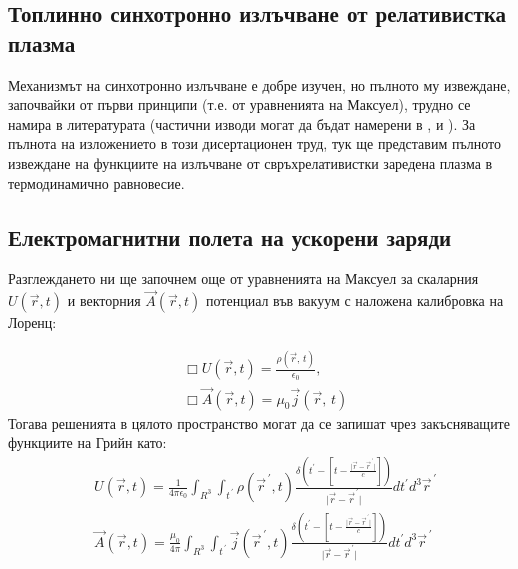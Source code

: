 \appendixpage
\begin{appendices}

	\section{Топлинно синхотронно излъчване от релативистка плазма}
	
	Механизмът на синхотронно излъчване е добре изучен, но пълното му извеждане, започвайки от първи принципи (т.е. от уравненията на Максуел), трудно се намира в литературата (частични изводи могат да бъдат намерени в \cite{Schwigner1949}, \cite{Westfold1959} и \cite{WESTFOLD_II}). За пълнота на изложението в този дисертационен труд, тук ще представим пълното извеждане на функциите на излъчване от свръхрелативистки заредена плазма в термодинамично равновесие.
	
	\subsection{Електромагнитни полета на ускорени заряди}
	
	Разглеждането ни ще започнем още от уравненията на Максуел за скаларния $U\left(\vec{r},t\right)$ и векторния $\vec{A}\left(\vec{r},t\right)$ потенциал във вакуум с наложена калибровка на Лоренц:
	
	\begin{equation}
		\begin{split}
		&\Box U\left(\vec{r},t\right) = \frac{\rho(\vec{r},\,t)}{\epsilon_0},\\
	    &\Box \vec{A}\left(\vec{r},t\right) = \mu_0\vec{j}(\vec{r},\,t)
		\end{split}
	\end{equation}
	Тогава решенията в цялото пространство могат да се запишат чрез закъсняващите функциите на Грийн като:
	\begin{equation}
		\begin{split}
			&U\left(\vec{r},t\right) = \frac{1}{4\pi\epsilon_0}\int_{R^3}\int_{t^{\,\prime}} \rho(\vec{r}^{\,\prime},t)\frac{\delta\left(t^\prime - \left[t - \frac{\vert \vec{r} - \vec{r}^{\,\prime}\vert}{c}\right]\right)}{\vert \vec{r} - \vec{r}^{\,\prime}\vert}dt^\prime d^3\vec{r}^{\,\prime}\\
			&\vec{A}\left(\vec{r},t\right) = \frac{\mu_0}{4\pi}\int_{R^3}\int_{t^{\,\prime}} \vec{j}(\vec{r}^{\,\prime},t)\frac{\delta\left(t^\prime - \left[t - \frac{\vert \vec{r} - \vec{r}^{\,\prime}\vert}{c}\right]\right)}{\vert \vec{r} - \vec{r}^{\,\prime}\vert}dt^\prime		d^3\vec{r}^{\,\prime} 
		\end{split}
	\end{equation} 
	

\end{appendices}
